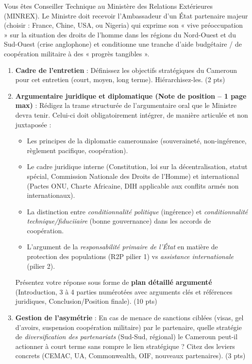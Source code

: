 \documentclass[11pt]{article}
\begin{document}
\begin{exercice}
Vous êtes Conseiller Technique au Ministère des Relations Extérieures (MINREX). Le Ministre doit recevoir l'Ambassadeur d'un État partenaire majeur (choisir : France, Chine, USA, ou Nigeria) qui exprime son « vive préoccupation » sur la situation des droits de l'homme dans les régions du Nord-Ouest et du Sud-Ouest (crise anglophone) et conditionne une tranche d'aide budgétaire / de coopération militaire à des « progrès tangibles ».

\begin{enumerate}
    \item \textbf{Cadre de l'entretien} : Définissez les objectifs stratégiques du Cameroun pour cet entretien (court, moyen, long terme). Hiérarchisez-les. (2 pts)
    
    \item \textbf{Argumentaire juridique et diplomatique (Note de position -- 1 page max)} : Rédigez la trame structurée de l'argumentaire oral que le Ministre devra tenir. Celui-ci doit obligatoirement intégrer, de manière articulée et non juxtaposée :
    \begin{itemize}
        \item Les principes de la diplomatie camerounaise (souveraineté, non-ingérence, règlement pacifique, coopération).
        \item Le cadre juridique interne (Constitution, loi sur la décentralisation, statut spécial, Commission Nationale des Droits de l'Homme) et international (Pactes ONU, Charte Africaine, DIH applicable aux conflits armés non internationaux).
        \item La distinction entre \textit{conditionnalité politique} (ingérence) et \textit{conditionnalité technique/fiduciiaire} (bonne gouvernance) dans les accords de coopération.
        \item L'argument de la \textit{responsabilité primaire de l'État} en matière de protection des populations (R2P pilier 1) vs \textit{assistance internationale} (pilier 2).
    \end{itemize}
    Présentez votre réponse sous forme de \textbf{plan détaillé argumenté} (Introduction, 3 à 4 parties numérotées avec arguments clés et références juridiques, Conclusion/Position finale). (10 pts)
    
    \item \textbf{Gestion de l'asymétrie} : En cas de menace de sanctions ciblées (visas, gel d'avoirs, suspension coopération militaire) par le partenaire, quelle stratégie de \textit{diversification des partenariats} (Sud-Sud, régional) le Cameroun peut-il actionner à court terme sans rompre le lien stratégique ? Citez des leviers concrets (CEMAC, UA, Commonwealth, OIF, nouveaux partenaires). (3 pts)
\end{enumerate}
\end{exercice}
\end{document}
